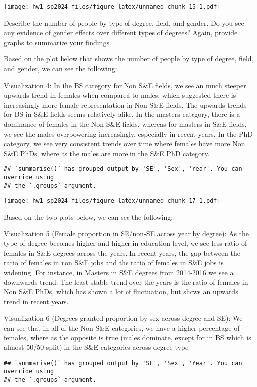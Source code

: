 \documentclass[
]{article}
\begin{document}
\texttt{[image: hw1\_sp2024\_files/figure-latex/unnamed-chunk-16-1.pdf]}

Describe the number of people by type of degree, field, and gender. Do
you see any evidence of gender effects over different types of degrees?
Again, provide graphs to summarize your findings.

Based on the plot below that shows the number of people by type of
degree, field, and gender, we can see the following:

Visualization 4: In the BS category for Non S\&E fields, we see an much
steeper upwards trend in females when compared to males, which suggested
there is increasingly more female representation in Non S\&E fields. The
upwards trends for BS in S\&E fields seems relatively alike. In the
masters category, there is a dominance of females in the Non S\&E
fields, whereas for masters in S\&E fields, we see the males
overpowering increasingly, especially in recent years. In the PhD
category, we see very consistent trends over time where females have
more Non S\&E PhDs, where as the males are more in the S\&E PhD
category.

\begin{verbatim}
## `summarise()` has grouped output by 'SE', 'Sex', 'Year'. You can override using
## the `.groups` argument.
\end{verbatim}

\texttt{[image: hw1\_sp2024\_files/figure-latex/unnamed-chunk-17-1.pdf]}

Based on the two plots below, we can see the following:

Visualization 5 (Female proportion in SE/non-SE across year by degree):
As the type of degree becomes higher and higher in education level, we
see less ratio of females in S\&E degrees across the years. In recent
years, the gap between the ratio of females in non S\&E jobs and the
ratio of females in S\&E jobs is widening. For instance, in Masters in
S\&E degrees from 2014-2016 we see a downwards trend. The least stable
trend over the years is the ratio of females in Non S\&E PhDs, which has
shown a lot of fluctuation, but shows an upwards trend in recent years.

Visualization 6 (Degrees granted proportion by sex across degree and
SE): We can see that in all of the Non S\&E categories, we have a higher
percentage of females, where as the opposite is true (males dominate,
except for in BS which is almost 50/50 split) in the S\&E categories
across degree type

\begin{verbatim}
## `summarise()` has grouped output by 'SE', 'Sex', 'Year'. You can override using
## the `.groups` argument.
\end{verbatim}
\end{document}
